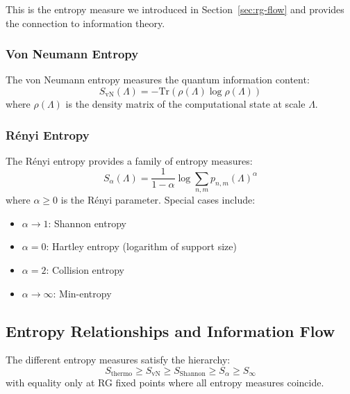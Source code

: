 This is the entropy measure we introduced in Section~\ref{sec:rg-flow} and provides the connection to information theory.

\subsubsection{Von Neumann Entropy}

\begin{definition}
\label{def:von-neumann-entropy}
The von Neumann entropy measures the quantum information content:
\[
S_{\text{vN}}(\Lambda) = -\text{Tr}(\rho(\Lambda) \log \rho(\Lambda))
\]
where $\rho(\Lambda)$ is the density matrix of the computational state at scale $\Lambda$.
\end{definition}

\subsubsection{Rényi Entropy}

\begin{definition}
\label{def:renyi-entropy}
The Rényi entropy provides a family of entropy measures:
\[
S_{\alpha}(\Lambda) = \frac{1}{1-\alpha} \log \sum_{n,m} p_{n,m}(\Lambda)^\alpha
\]
where $\alpha \geq 0$ is the Rényi parameter. Special cases include:
\begin{itemize}
\item $\alpha \to 1$: Shannon entropy
\item $\alpha = 0$: Hartley entropy (logarithm of support size)
\item $\alpha = 2$: Collision entropy
\item $\alpha \to \infty$: Min-entropy
\end{itemize}
\end{definition}

\subsection{Entropy Relationships and Information Flow}

\begin{theorem}
\label{thm:entropy-hierarchy}
The different entropy measures satisfy the hierarchy:
\[
S_{\text{thermo}} \geq S_{\text{vN}} \geq S_{\text{Shannon}} \geq S_{\alpha} \geq S_{\infty}
\]
with equality only at RG fixed points where all entropy measures coincide.
\end{theorem}

